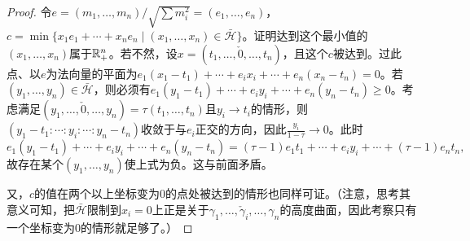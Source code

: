 \begin{proof}
令$e=(m_1,\dots,m_n)/\sqrt{\sum m_i^2}=(e_1,\dots,e_n)$，$c=\min\{x_1e_1+\cdots+x_ne_n\mid(x_1,\dots,x_n)\in\bar{\mathcal{H}}\}$。证明达到这个最小值的$(x_1,\dots,x_n)$属于$\mathbb{R}_+^n$。若不然，设$x=(t_1,\dots,\check{0},\dots,t_n)$，且这个$c$被达到。过此点、以$e$为法向量的平面为$e_1(x_1-t_1)+\cdots+e_ix_i+\cdots+e_n(x_n-t_n)=0$。若$(y_1,\dots,y_n)\in\bar{\mathcal{H}}$，则必须有$e_1(y_1-t_1)+\cdots+e_iy_i+\cdots+e_n(y_n-t_n)\ge0$。考虑满足$(y_1,\dots,\check{0},\dots,y_n)=\tau(t_1,\dots,t_n)$且$y_i\to t_i$的情形，则$(y_1-t_1:\cdots:y_i:\cdots:y_n-t_n)$收敛于与$e_i$正交的方向，因此$\frac{y_i}{1-\tau}\to0$。此时
\[
e_1(y_1-t_1)+\cdots+e_iy_i+\cdots+e_n(y_n-t_n)
=(\tau-1)e_1t_1+\cdots+e_iy_i+\cdots+(\tau-1)e_nt_n,
\]
故存在某个$(y_1,\dots,y_n)$使上式为负。这与前面矛盾。

又，$c$的值在两个以上坐标变为$0$的点处被达到的情形也同样可证。（注意，思考其意义可知，把$\bar{\mathcal{H}}$限制到$x_i=0$上正是关于$\gamma_1,\dots,\check{\gamma}_i,\dots,\gamma_n$的高度曲面，因此考察只有一个坐标变为$0$的情形就足够了。）
\end{proof}
